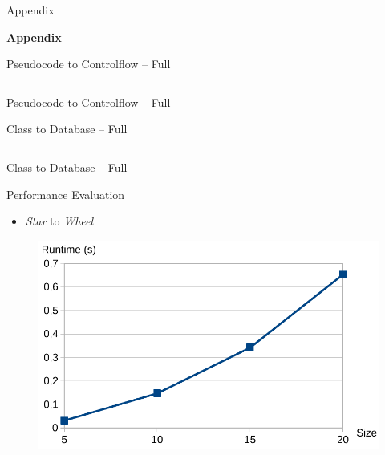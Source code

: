 \documentclass[usenames,dvipsnames]{beamer}
\begin{document}
	\begin{frame}{Appendix}
		\begin{center}
			{\LARGE \textbf{Appendix}}
		\end{center}
	\end{frame}

	\begin{frame}{Pseudocode to Controlflow -- Full}
		\begin{columns}
			\column{\dimexpr\paperwidth-20pt}
			
		\end{columns}
	\end{frame}

	\begin{frame}{Pseudocode to Controlflow -- Full}
		
	\end{frame}
	
	\begin{frame}{Class to Database -- Full}
		\begin{columns}
			\column{\dimexpr\paperwidth-20pt}
			
		\end{columns}
	\end{frame}
	
	\begin{frame}{Class to Database -- Full}
		
	\end{frame}

	\begin{frame}{Performance Evaluation}
		\begin{itemize}
			\item \emph{Star} to \emph{Wheel}
		\end{itemize}
		\begin{figure}
			\centering
			\includegraphics[width=\textwidth]{figures/performance/star2wheel}
		\end{figure}
	\end{frame}
	
\end{document}
